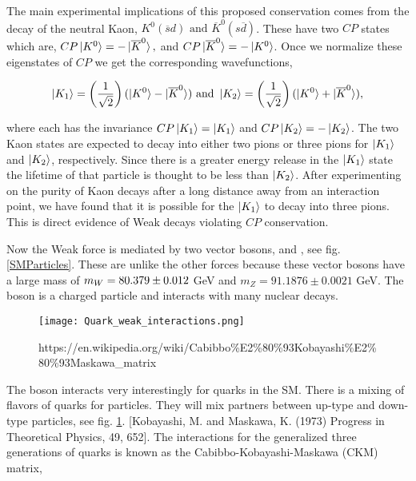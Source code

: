The main experimental implications of this proposed conservation comes from the decay of the neutral Kaon, $K^0(\overline{s}d) \text{ and } \overline{K}^0(s\overline{d})$. These have two $CP$ states which are, $CP\ket{K^0}=-\ket{\overline{K}^0},$ and $CP\ket{\overline{K}^0}=-\ket{K^0}$. Once we normalize these eigenstates of $CP$ we get the corresponding wavefunctions,

\begin{equation*}\label{KaonEigenstate}
\ket{K_1}=\left(\frac{1}{\sqrt{2}}\right)(\ket{K^0}-\ket{\overline{K}^0}) \text{ and } \ket{K_2}=\left(\frac{1}{\sqrt{2}}\right)(\ket{K^0}+\ket{\overline{K}^0}),
\end{equation*}

where each has the invariance $CP\ket{K_1}=\ket{K_1}$ and $CP\ket{K_2}=-\ket{K_2}$. The two Kaon states are expected to decay into either two pions or three pions for $\ket{K_1}$ and $\ket{K_2}$, respectively. Since there is a greater energy release in the $\ket{K_1}$ state the lifetime of that particle is thought to be less than $\ket{K_2}$. After experimenting on the purity of Kaon decays after a long distance away from an interaction point, we have found that it is possible for the $\ket{K_1}$ to decay into three pions. This is direct evidence of Weak decays violating $CP$ conservation. 

Now the Weak force is mediated by two vector bosons, \W and \Z, see fig. \ref{SMParticles}. These are unlike the other forces because these vector bosons have a large mass of $m_{W}=80.379\pm0.012$ GeV and $m_Z=91.1876\pm0.0021$ GeV. The \W boson is a charged particle and interacts with many nuclear decays. 

\begin{figure}
 	\centering
	\texttt{[image: Quark\_weak\_interactions.png]}
 	\caption{https://en.wikipedia.org/wiki/Cabibbo\%E2\%80\%93Kobayashi\%E2\%80\%93Maskawa\_matrix}
 	\label{CKMInteractions} 
\end{figure}

The \W boson interacts very interestingly for quarks in the SM. There is a mixing of flavors of quarks for particles. They will mix partners between up-type and down-type particles, see fig. \ref{CKMInteractions}. [Kobayashi, M. and Maskawa, K. (1973) Progress in Theoretical Physics, 49, 652]. The interactions for the generalized three generations of quarks is known as the Cabibbo-Kobayashi-Maskawa (CKM) matrix,

